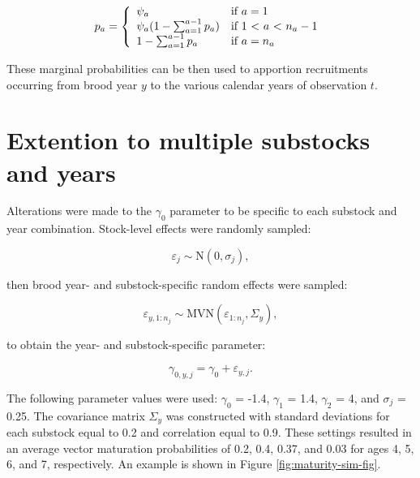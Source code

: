 \documentclass[12pt,]{book}
\theoremstyle{definition}
\theoremstyle{definition}
\theoremstyle{definition}
\theoremstyle{remark}
\begin{document}
\[
  p_a = \left\{ \begin{array}{ll}
  \psi_a & \mbox{if $a = 1$} \\
  \psi_a(1 - \sum_{a=1}^{a-1} p_a) & \mbox{if 1 < $a$ < $n_a - 1$} \\
  1 - \sum_{a=1}^{a-1} p_a & \mbox{if $a = n_a$ } \\
  \end{array}
  \right. \\
\]

\noindent
These marginal probabilities can be then used to apportion recruitments
occurring from brood year \(y\) to the various calendar years of
observation \(t\).

\section{Extention to multiple substocks and
years}\label{extention-to-multiple-substocks-and-years}

\noindent
Alterations were made to the \(\gamma_0\) parameter to be specific to
each substock and year combination. Stock-level effects were randomly
sampled:

\[\varepsilon_{j} \sim \text{N}(0, \sigma_{j}),\]

\noindent
then brood year- and substock-specific random effects were sampled:

\[\varepsilon_{y,1:n_j} \sim \text{MVN}(\varepsilon_{1:n_j}, \Sigma_{y}),\]

\noindent
to obtain the year- and substock-specific parameter:

\[\gamma_{0,y,j} = \gamma_0 + \varepsilon_{y,j}.\]

The following parameter values were used: \(\gamma_0\) = -1.4,
\(\gamma_1\) = 1.4, \(\gamma_2\) = 4, and \(\sigma_{j}\) = 0.25. The
covariance matrix \(\Sigma_y\) was constructed with standard deviations
for each substock equal to 0.2 and correlation equal to 0.9. These
settings resulted in an average vector maturation probabilities of 0.2,
0.4, 0.37, and 0.03 for ages 4, 5, 6, and 7, respectively. An example is
shown in Figure \ref{fig:maturity-sim-fig}.
\end{document}
